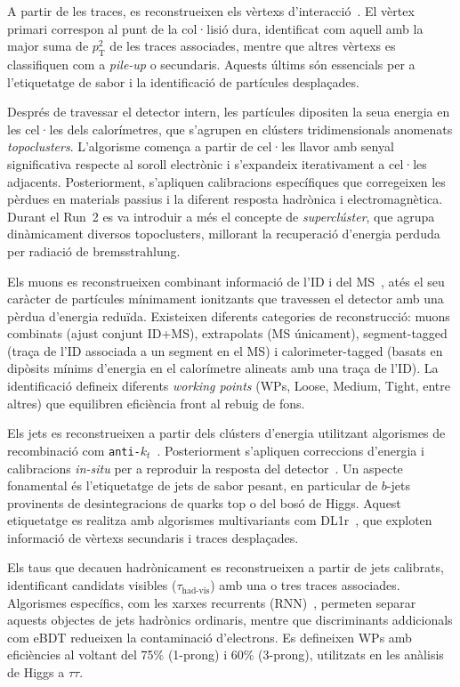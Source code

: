 A partir de les traces, es reconstrueixen els vèrtexs d’interacció~\cite{vertex_run1,vertex_run2,vertex_run3,vertex_run3_2}.  
El vèrtex primari correspon al punt de la col·lisió dura, identificat com aquell amb la major suma de $p_{\mathrm{T}}^{2}$ de les traces associades, mentre que altres vèrtexs es classifiquen com a \textit{pile-up} o secundaris.  
Aquests últims són essencials per a l’etiquetatge de sabor i la identificació de partícules desplaçades.

Després de travessar el detector intern, les partícules dipositen la seua energia en les cel·les dels calorímetres, que s’agrupen en clústers tridimensionals anomenats \textit{topoclusters}.  
L’algorisme comença a partir de cel·les llavor amb senyal significativa respecte al soroll electrònic i s’expandeix iterativament a cel·les adjacents.  
Posteriorment, s’apliquen calibracions específiques que corregeixen les pèrdues en materials passius i la diferent resposta hadrònica i electromagnètica.  
Durant el Run~2 es va introduir a més el concepte de \textit{superclúster}, que agrupa dinàmicament diversos topoclusters, millorant la recuperació d’energia perduda per radiació de bremsstrahlung.

Els muons es reconstrueixen combinant informació de l’ID i del MS~\cite{muon_reco_run2}, atés el seu caràcter de partícules mínimament ionitzants que travessen el detector amb una pèrdua d’energia reduïda.  
Existeixen diferents categories de reconstrucció: muons combinats (ajust conjunt ID+MS), extrapolats (MS únicament), segment-tagged (traça de l’ID associada a un segment en el MS) i calorimeter-tagged (basats en dipòsits mínims d’energia en el calorímetre alineats amb una traça de l’ID).  
La identificació defineix diferents \textit{working points} (WPs, Loose, Medium, Tight, entre altres) que equilibren eficiència front al rebuig de fons.

Els jets es reconstrueixen a partir dels clústers d’energia utilitzant algorismes de recombinació com \texttt{anti-$k_{t}$}~\cite{Cacciari_2008}.  
Posteriorment s’apliquen correccions d’energia i calibracions \textit{in-situ} per a reproduir la resposta del detector~\cite{jets_calib}.  
Un aspecte fonamental és l’etiquetatge de jets de sabor pesant, en particular de $b$-jets provinents de desintegracions de quarks top o del bosó de Higgs.  
Aquest etiquetatge es realitza amb algorismes multivariants com DL1r~\cite{tagging}, que exploten informació de vèrtexs secundaris i traces desplaçades.

Els taus que decauen hadrònicament es reconstrueixen a partir de jets calibrats, identificant candidats visibles ($\tau_{\text{had-vis}}$) amb una o tres traces associades.  
Algorismes específics, com les xarxes recurrents (RNN)~\cite{ATL-PHYS-PUB-2022-044}, permeten separar aquests objectes de jets hadrònics ordinaris, mentre que discriminants addicionals com eBDT redueixen la contaminació d’electrons.  
Es defineixen WPs amb eficiències al voltant del 75\% (1-prong) i 60\% (3-prong), utilitzats en les anàlisis de Higgs a $\tau\tau$.

